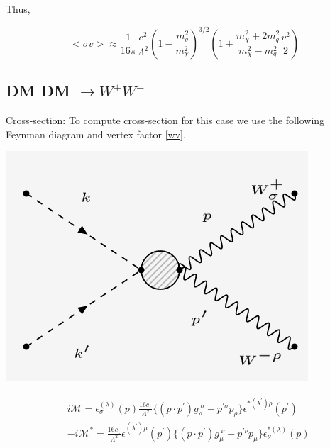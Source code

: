 \documentclass[12pt]{report}
\begin{document}
Thus, 

\begin{equation}
<\sigma v > \approx \frac{1}{16 \pi} \frac{c^2}{\Lambda^2} (1-\frac{m_q^2}{m_\chi^2})^{3/2} 
\left(1+ \frac{m_\chi^2 +2m_q^2}{m_\chi^2-m_q^2} \frac{v^2}{2}\right) \label{qqcross}
\end{equation}

\newpage

\subsection{DM DM $\longrightarrow W^+W^-$}

Cross-section: To compute cross-section for this case we use the following Feynman diagram and vertex factor \ref{wv}.

\begin{center}
\includegraphics[scale=0.5]{WW.png}
\end{center}


\begin{align*}
&i \mathcal{M}= \epsilon^{(\lambda)}_\sigma (p) \frac{16c_1}{\Lambda^2} \{(p\cdot p^\prime) g_\rho^{\;\sigma}-p^{\prime \sigma} p_\rho\} \epsilon^{* (\lambda^\prime) \rho}(p^\prime)\\
&-i \mathcal{M}^* = \frac{16c_1}{\Lambda^2} \epsilon^{(\lambda^\prime) \mu}(p^\prime) \{(p\cdot p^\prime) g^{\;\nu}_\mu -p^{\prime \nu} p_\mu \} \epsilon^{*(\lambda)}_\nu (p)
\end{align*}
\end{document}
